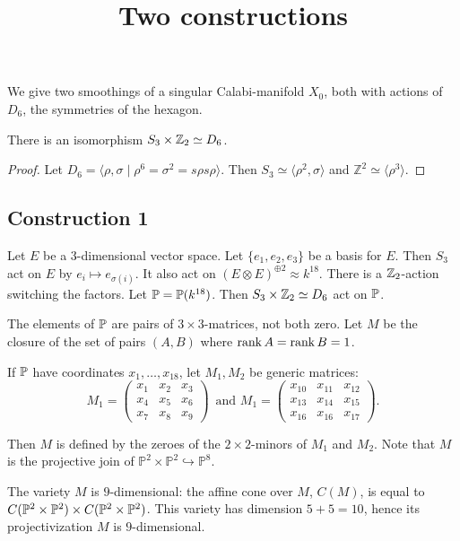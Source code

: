 \documentclass[11pt, english]{article}
\begin{document}
\title{Two constructions}
\date{}
\maketitle

We give two smoothings of a singular Calabi-manifold $X_0$, both with actions of $D_6$, the symmetries of the hexagon.

\begin{lemma}
There is an isomorphism $S_3 \times \mathbb{Z}_2 \simeq D_6$.
\end{lemma}
\begin{proof}
Let $D_6 = \langle \rho, \sigma \mid \rho^6=\sigma^2=s\rho s \rho \rangle$. Then $S_3 \simeq \langle \rho^2, \sigma \rangle $ and $\mathbb Z^2 \simeq \langle \rho ^3 \rangle$.
\end{proof}

\subsection{Construction 1}

Let $E$ be a 3-dimensional vector space. Let $\{e_1,e_2,e_3\}$ be a basis for $E$. Then $S_3$ act on $E$ by $e_i \mapsto e_{\sigma(i)}$. It also act on $(E \otimes E)^{\oplus 2}\approx k^{18}$. There is a $\mathbb{Z}_2$-action switching the factors. Let $\mathbb{P}=\mathbb{P}(k^{18})$. Then $S_3 \times \mathbb{Z}_2\simeq D_6$ act on $\mathbb{P}$. 

The elements of $\mathbb{P}$ are pairs of $3 \times 3$-matrices, not both zero. Let $M$ be the closure of the set of pairs $(A,B)$ where $\operatorname{\mathrm{rank}} A = \operatorname{\mathrm{rank}} B = 1$. 

If $\mathbb{P}$ have coordinates $x_1,\ldots,x_{18}$, let $M_1, M_2$ be generic matrices:
\[
M_1 = \begin{pmatrix}
x_1 & x_2 & x_3 \\
x_4 & x_5 & x_6 \\
x_7 & x_8 & x_9 
\end{pmatrix}\,
\text{ and }
M_1 = \begin{pmatrix}
x_{10} & x_{11} & x_{12} \\
x_{13} & x_{14} & x_{15} \\
x_{16} & x_{16} & x_{17}
\end{pmatrix}.
\]

Then $M$ is defined by the zeroes of the $2 \times 2$-minors of $M_1$ and $M_2$. Note that $M$ is the projective join of $\mathbb P^2 \times \mathbb P^2 \hookrightarrow \mathbb P^8$. 

The variety $M$ is $9$-dimensional: the affine cone over $M$, $C(M)$, is equal to $C(\mathbb P^2 \times \mathbb{P}^2) \times C(\mathbb P^2 \times \mathbb{P}^2)$. This variety has dimension $5+5=10$, hence its projectivization $M$ is $9$-dimensional. 
\end{document}
